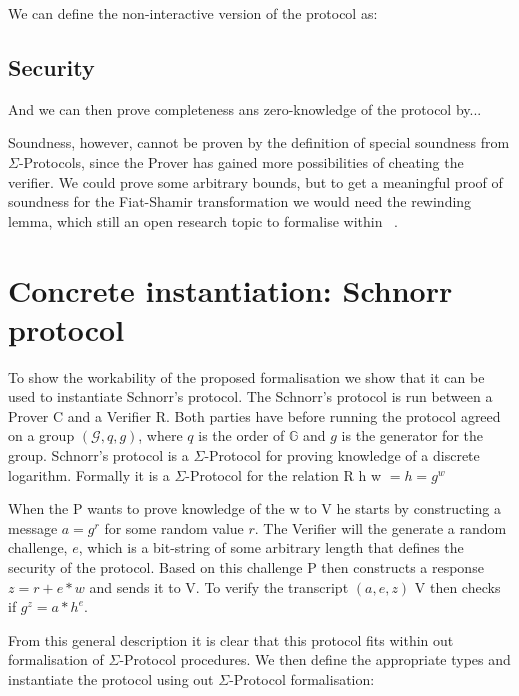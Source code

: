 We can define the non-interactive version of the protocol as:

\subsection{Security}
\label{subsec:sigma:fiat:security}

And we can then prove completeness ans zero-knowledge of the protocol by...

Soundness, however, cannot be proven by the definition of special soundness from
$\Sigma$-Protocols, since the Prover has gained more possibilities of cheating
the verifier. We could prove some arbitrary bounds, but to get a meaningful
proof of soundness for the Fiat-Shamir transformation we would need the
rewinding lemma, which still an open research topic to formalise within \easycrypt\ \cite{ec_intro}.

\section{Concrete instantiation: Schnorr protocol}
\label{sec:schnorr}
To show the workability of the proposed formalisation we show that it can be
used to instantiate Schnorr's protocol.
The Schnorr's protocol is run between a Prover C and a
Verifier R. Both parties have before running the protocol agreed on a group
$(\mathcal{G}, q, g)$, where $q$ is the order of $\mathbb{G}$ and $g$ is the
generator for the group.
Schnorr's protocol is a $\Sigma$-Protocol for proving knowledge of a discrete
logarithm. Formally it is a $\Sigma$-Protocol for the relation R h w $= h = g^{w}$

When the P wants to prove knowledge of the w to V he starts by
constructing a message $a = g^{r}$ for some random value $r$. The Verifier will
the generate a random challenge, $e$, which is a bit-string of some arbitrary length
that defines the security of the protocol.
Based on this challenge P then constructs a response $z = r + e * w$ and sends
it to V.
To verify the transcript $(a,e,z)$ V then checks if $g^{z} = a * h^{e}$.

From this general description it is clear that this protocol fits within out
formalisation of $\Sigma$-Protocol procedures. We then define the appropriate
types and instantiate the protocol using out $\Sigma$-Protocol formalisation:

